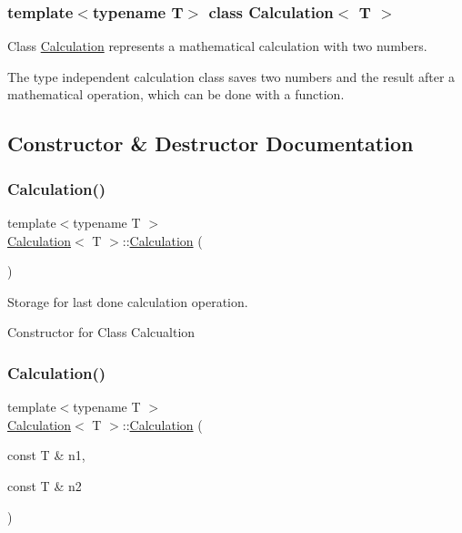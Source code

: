 \subsubsection*{template$<$typename T$>$\newline
class Calculation$<$ T $>$}

Class \mbox{\hyperlink{class_calculation}{Calculation}} represents a mathematical calculation with two numbers. 

The type independent calculation class saves two numbers and the result after a mathematical operation, which can be done with a function. 

\subsection{Constructor \& Destructor Documentation}
\mbox{\label{class_calculation_a2e43307f8d5565b318b92f6a23dd49ff}} 
\subsubsection{\texorpdfstring{Calculation()}{Calculation()}\hspace{0.1cm}{\footnotesize\ttfamily [1/2]}}
{\footnotesize\ttfamily template$<$typename T $>$ \\
\mbox{\hyperlink{class_calculation}{Calculation}}$<$ T $>$\+::\mbox{\hyperlink{class_calculation}{Calculation}} (\begin{DoxyParamCaption}{ }\end{DoxyParamCaption})}



Storage for last done calculation operation. 

Constructor for Class Calcualtion \mbox{\label{class_calculation_aad88cc7f771150b7ef24aed69380da50}} 
\subsubsection{\texorpdfstring{Calculation()}{Calculation()}\hspace{0.1cm}{\footnotesize\ttfamily [2/2]}}
{\footnotesize\ttfamily template$<$typename T $>$ \\
\mbox{\hyperlink{class_calculation}{Calculation}}$<$ T $>$\+::\mbox{\hyperlink{class_calculation}{Calculation}} (\begin{DoxyParamCaption}\item[{const T \&}]{n1,  }\item[{const T \&}]{n2 }\end{DoxyParamCaption})}



